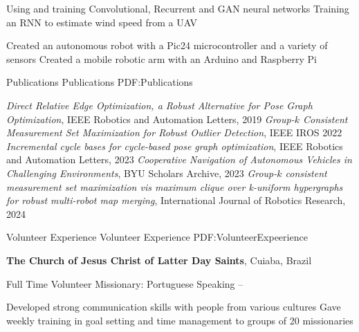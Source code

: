 \documentclass[letterpaper,MMMyyyy,nonstopmode]{simpleresumecv}
\begin{document}
\begin{Body}
\Gap
{}
\Gap
\BulletItem
    Using and training Convolutional, Recurrent and GAN neural networks
\BulletItem
    Training an RNN to estimate wind speed from a UAV


\Gap
{}
\Gap
\BulletItem
Created an autonomous robot with a Pic24 microcontroller and a variety of sensors
\BulletItem
Created a  mobile robotic arm with an Arduino and Raspberry Pi


\Section
{Publications}
{Publications}
{PDF:Publications}

\BulletItem
\textit{Direct Relative Edge Optimization, a Robust Alternative for Pose Graph Optimization}, IEEE Robotics and Automation Letters, 2019
\BulletItem \textit{Group-$k$ Consistent Measurement Set Maximization for Robust Outlier Detection}, IEEE IROS 2022
\BulletItem \textit{Incremental cycle bases for cycle-based pose graph optimization}, IEEE Robotics and Automation Letters, 2023
\BulletItem \textit{Cooperative Navigation of Autonomous Vehicles in Challenging Environments}, BYU Scholars Archive, 2023
\BulletItem \textit{Group-$k$ consistent measurement set maximization vis maximum clique over k-uniform hypergraphs for robust multi-robot map merging}, International Journal of Robotics Research, 2024



\Section
{Volunteer Experience}
{Volunteer Experience}
{PDF:VolunteerExpeerience}

\Gap
\Entry
\textbf{The Church of Jesus Christ of Latter Day Saints},
Cuiaba, Brazil

\Gap
\BulletItem
Full Time Volunteer Missionary: Portuguese Speaking
\hfill
{}--
\begin{Detail}
\SubBulletItem
Developed strong communication skills with people from various cultures
\SubBulletItem
Gave weekly training in goal setting and time management to groups of 20 missionaries
\end{Detail}

\end{Body}

\thispagestyle{empty}
\end{document}
